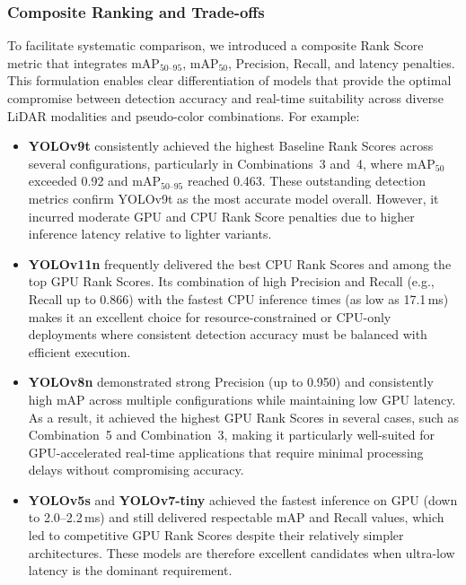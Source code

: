 \documentclass[runningheads]{llncs}
\begin{document}
\subsubsection{Composite Ranking and Trade-offs}

To facilitate systematic comparison, we introduced a composite Rank Score metric that integrates mAP$_{50\text{--}95}$, mAP$_{50}$, Precision, Recall, and latency penalties. This formulation enables clear differentiation of models that provide the optimal compromise between detection accuracy and real-time suitability across diverse LiDAR modalities and pseudo-color combinations. For example:

\begin{itemize}
    \item \textbf{YOLOv9t} consistently achieved the highest Baseline Rank Scores across several configurations, particularly in Combinations~3 and~4, where mAP$_{50}$ exceeded 0.92 and mAP$_{50\text{--}95}$ reached 0.463. These outstanding detection metrics confirm YOLOv9t as the most accurate model overall. However, it incurred moderate GPU and CPU Rank Score penalties due to higher inference latency relative to lighter variants.
    
    \item \textbf{YOLOv11n} frequently delivered the best CPU Rank Scores and among the top GPU Rank Scores. Its combination of high Precision and Recall (e.g., Recall up to 0.866) with the fastest CPU inference times (as low as 17.1\,ms) makes it an excellent choice for resource-constrained or CPU-only deployments where consistent detection accuracy must be balanced with efficient execution.
    
    \item \textbf{YOLOv8n} demonstrated strong Precision (up to 0.950) and consistently high mAP across multiple configurations while maintaining low GPU latency. As a result, it achieved the highest GPU Rank Scores in several cases, such as Combination~5 and Combination~3, making it particularly well-suited for GPU-accelerated real-time applications that require minimal processing delays without compromising accuracy.
    
    \item \textbf{YOLOv5s} and \textbf{YOLOv7-tiny} achieved the fastest inference on GPU (down to 2.0--2.2\,ms) and still delivered respectable mAP and Recall values, which led to competitive GPU Rank Scores despite their relatively simpler architectures. These models are therefore excellent candidates when ultra-low latency is the dominant requirement.
\end{itemize}
\end{document}
